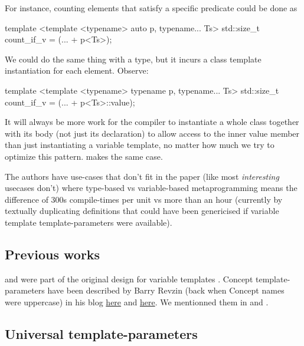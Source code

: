 \documentclass{wg21}
\begin{document}
For instance, counting elements that satisfy a specific predicate could be done as

\begin{colorblock}
template <template <typename> auto p, typename... Ts>
std::size_t count_if_v = (... + p<Ts>);
\end{colorblock}

We could do the same thing with a type, but it incurs a class template instantiation for each element. Observe:

\begin{colorblock}
template <template <typename> typename p, typename... Ts>
std::size_t count_if_v = (... + p<Ts>::value);
\end{colorblock}

It will always be more work for the compiler to instantiate a whole class together with its body (not just its declaration) to allow access to the inner value member than just instantiating a variable template, no matter how much we try to optimize this pattern.  makes the same case.

The authors have use-cases that don't fit in the paper (like most \emph{interesting} usecases don't) where type-based vs variable-based metaprogramming means the difference of 300s compile-times per unit vs more than an hour (currently by textually duplicating definitions that could have been genericised if variable template template-parameters were available).

\subsection{Previous works}

and were part of the original design for variable templates .
Concept template-parameters have been described by Barry Revzin (back when Concept names were uppercase) in his blog \href{https://brevzin.github.io/c++/2019/01/09/concept-templates/}{here} and \href{https://brevzin.github.io/c++/2019/03/24/concept-templates-2/}{here}.
We mentionned them in  and .

\subsection{Universal template-parameters}
\end{document}
